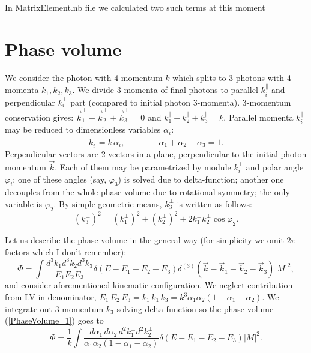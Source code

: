 \documentclass[12pt]{article}
\begin{document}
In MatrixElement.nb file we calculated two such terms at this moment




\section{Phase volume}
We consider the photon with 4-momentum $k$ which splits to 3 photons with 4-momenta $k_1, k_2, k_3$. We divide 3-momenta of final photons to parallel $k_i^\parallel$ and perpendicular $k_i^\perp$ part (compared to initial photon 3-momenta). 3-momentum conservation gives: $\vec{k}_1^\perp + \vec{k}_2^\perp +\vec{k}_3^\perp = 0$ and $k_1^\parallel +k_2^\parallel + k_3^\parallel = k$. Parallel momenta $k_i^\parallel$ may be reduced to dimensionless variables $\alpha_i$:
\begin{equation}
k_i^\parallel = k\, \alpha_i, \qquad \qquad \alpha_1 + \alpha_2+\alpha_3=1.
\end{equation}
Perpendicular vectors are 2-vectors in a plane, perpendicular to the initial photon momentum $\vec{k}$. Each of them may be parametrized by module $k_i^\perp$ and polar angle $\varphi_i$; one of these angles (say, $\varphi_3$) is solved due to delta-function; another one decouples from the whole phase volume due to rotational symmetry; the only variable is $\varphi_2$. By simple geometric means, $k_3^\perp$ is written as follows:
\begin{equation}
(k_3^\perp)^2 = (k_1^\perp)^2 + (k_2^\perp)^2 + 2k_1^\perp k_2^\perp \cos \varphi_2.
\end{equation}  

Let us describe the phase volume in the general way (for simplicity we omit $2\pi$ factors which I don't remember):
\begin{equation}
\label{PhaseVolume_1}
\Phi = \int \frac{d^3k_1 d^3k_2 d^3k_3}{E_1 E_2 E_3} \delta(E-E_1-E_2-E_3)\delta^{(3)}\left( \vec{k} -\vec{k}_1-\vec{k}_2 - \vec{k}_3\right) |M|^2,
\end{equation}
and consider aforementioned kinematic configuration. We neglect contribution from LV in denominator, $E_1\,E_2\,E_3 = k_1\,k_1\,k_3 = k^3 \alpha_1\alpha_2(1-\alpha_1-\alpha_2)$. We integrate out 3-momentum $k_3$ solving delta-function so the phase volume (\ref{PhaseVolume_1}) goes to
\begin{equation}
\label{PhaseVolume_2}
\Phi = \frac{1}{k}\int \frac{d\alpha_1\, d\alpha_2\, d^2k_1^\perp d^2k_2^\perp}{\alpha_1\alpha_2(1-\alpha_1-\alpha_2)} \delta(E-E_1-E_2-E_3) |M|^2.
\end{equation}
\end{document}
